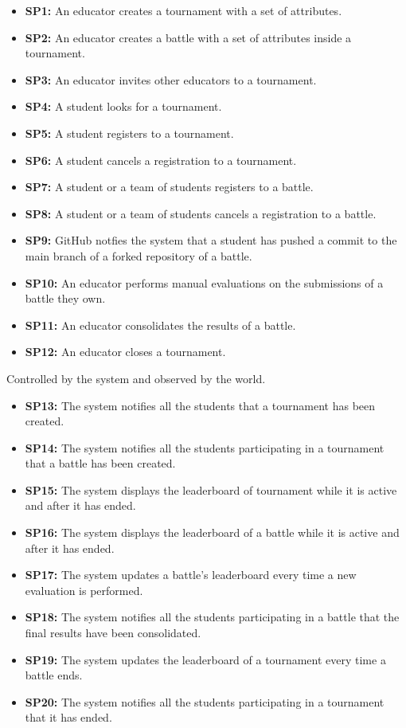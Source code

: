 \documentclass{article}
\begin{document}
\begin{itemize}
    \item \textbf{SP1:} An educator creates a tournament with a set of attributes.
    \item \textbf{SP2:} An educator creates a battle with a set of attributes inside a tournament.
    \item \textbf{SP3:} An educator invites other educators to a tournament.
    \item \textbf{SP4:} A student looks for a tournament.
    \item \textbf{SP5:} A student registers to a tournament.
    \item \textbf{SP6:} A student cancels a registration to a tournament.
    \item \textbf{SP7:} A student or a team of students registers to a battle.
    \item \textbf{SP8:} A student or a team of students cancels a registration to a battle.
    \item \textbf{SP9:} GitHub notfies the system that a student has pushed a commit to the main branch of a forked repository of a battle. 
    \item \textbf{SP10:} An educator performs manual evaluations on the submissions of a battle they own.
    \item \textbf{SP11:} An educator consolidates the results of a battle.
    \item \textbf{SP12:} An educator closes a tournament.
\end{itemize}

Controlled by the system and observed by the world.

\begin{itemize}
    \item \textbf{SP13:} The system notifies all the students that a tournament has been created.
    \item \textbf{SP14:} The system notifies all the students participating in a tournament that a battle has been created.
    \item \textbf{SP15:} The system displays the leaderboard of tournament while it is active and after it has ended.
    \item \textbf{SP16:} The system displays the leaderboard of a battle while it is active and after it has ended.
    \item \textbf{SP17:} The system updates a battle's leaderboard every time a new evaluation is performed.
    \item \textbf{SP18:} The system notifies all the students participating in a battle that the final results have been consolidated.
    \item \textbf{SP19:} The system updates the leaderboard of a tournament every time a battle ends.
    \item \textbf{SP20:} The system notifies all the students participating in a tournament that it has ended.
\end{itemize}
\end{document}
